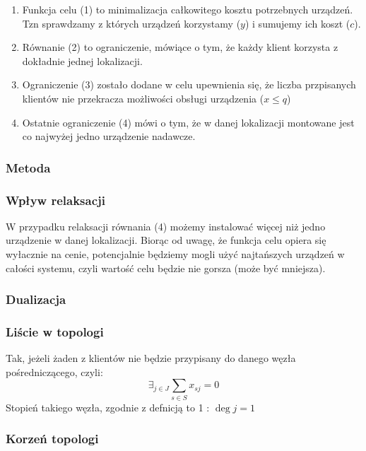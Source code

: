 \documentclass{article}
\begin{document}
\begin{enumerate}
  \item Funkcja celu (1) to minimalizacja całkowitego kosztu potrzebnych urządzeń. Tzn sprawdzamy z których urządzeń korzystamy ($y$) i sumujemy ich koszt ($c$).
  \item Równanie (2) to ograniczenie, mówiące o tym, że każdy klient korzysta z dokładnie jednej lokalizacji.
  \item Ograniczenie (3) zostało dodane w celu upewnienia się, że liczba przpisanych klientów nie przekracza możliwości obsługi urządzenia ($x \leq q$)
  \item Ostatnie ograniczenie (4) mówi o tym, że w danej lokalizacji montowane jest co najwyżej jedno urządzenie nadawcze.
\end{enumerate}

\subsubsection{Metoda}

\subsubsection{Wpływ relaksacji}
W przypadku relaksacji równania (4) możemy instalować więcej niż jedno urządzenie w danej lokalizacji. Biorąc od uwagę, że funkcja celu
opiera się wyłacznie na cenie, potencjalnie będziemy mogli użyć najtańszych urządzeń w całości systemu, czyli wartość celu będzie nie gorsza
(może być mniejsza).

\subsubsection{Dualizacja}


\subsubsection{Liście w topologi}
 Tak, jeżeli żaden z klientów nie będzie przypisany do danego węzła pośredniczącego, czyli:
 \begin{equation}
   \exists_{j \in J} \sum_{s \in S} x_{sj} = 0
 \end{equation}
 Stopień takiego węzła, zgodnie z defnicją to 1 : $\deg j = 1$

\subsubsection{Korzeń topologi}
\end{document}
